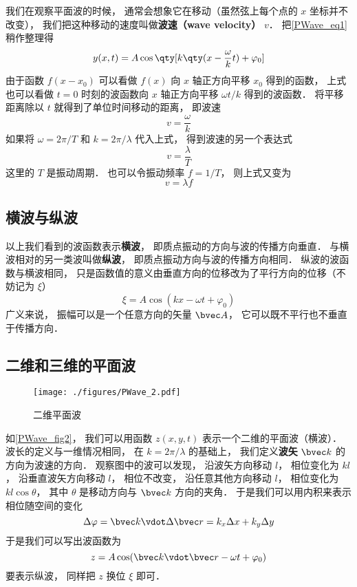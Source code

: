 我们在观察平面波的时候， 通常会想象它在移动（虽然弦上每个点的 $x$ 坐标并不改变）， 我们把这种移动的速度叫做\textbf{波速（wave velocity）} $v$． 把\autoref{PWave_eq1} 稍作整理得
\begin{equation}
y(x, t) = A\cos \qty[k \qty(x - \frac{\omega}{k} t) + \varphi_0]
\end{equation}
由于函数 $f(x - x_0)$ 可以看做 $f(x)$ 向 $x$ 轴正方向平移 $x_0$ 得到的函数， 上式也可以看做 $t = 0$ 时刻的波函数向 $x$ 轴正方向平移 $\omega t/k$ 得到的波函数． 将平移距离除以 $t$ 就得到了单位时间移动的距离， 即波速
\begin{equation}
v = \frac{\omega}{k}
\end{equation}
如果将 $\omega = 2\pi/T$ 和 $k = 2\pi/\lambda$ 代入上式， 得到波速的另一个表达式
\begin{equation}
v = \frac{\lambda}{T}
\end{equation}
这里的 $T$ 是振动周期． 也可以令振动频率 $f = 1/T$， 则上式又变为
\begin{equation}
v = \lambda f
\end{equation}

\subsection{横波与纵波}
以上我们看到的波函数表示\textbf{横波}， 即质点振动的方向与波的传播方向垂直． 与横波相对的另一类波叫做\textbf{纵波}， 即质点振动方向与波的传播方向相同． 纵波的波函数与横波相同， 只是函数值的意义由垂直方向的位移改为了平行方向的位移（不妨记为 $\xi$）
\begin{equation}
\xi = A \cos(k x - \omega t + \varphi_0)
\end{equation}
广义来说， 振幅可以是一个任意方向的矢量 $\bvec A$， 它可以既不平行也不垂直于传播方向．

\subsection{二维和三维的平面波}

\begin{figure}[ht]
\centering
\texttt{[image: ./figures/PWave\_2.pdf]}
\caption{二维平面波} \label{PWave_fig2}
\end{figure}

如\autoref{PWave_fig2}， 我们可以用函数 $z(x,y,t)$ 表示一个二维的平面波（横波）． 波长的定义与一维情况相同， 在 $k = 2\pi/\lambda$ 的基础上， 我们定义\textbf{波矢} $\bvec k$ 的方向为波速的方向．
观察图中的波可以发现， 沿波矢方向移动 $l$， 相位变化为 $kl$， 沿垂直波矢方向移动 $l$， 相位不改变， 沿任意其他方向移动 $l$， 相位变化为 $kl\cos\theta$， 其中 $\theta$ 是移动方向与 $\bvec k$ 方向的夹角． 于是我们可以用内积来表示相位随空间的变化
\begin{equation}
\Delta\varphi = \bvec k \vdot \Delta\bvec r = k_x \Delta x + k_y \Delta y
\end{equation}
于是我们可以写出波函数为
\begin{equation}\label{PWave_eq8}
z = A \cos(\bvec k \vdot \bvec r - \omega t + \varphi_0)
\end{equation}
要表示纵波， 同样把 $z$ 换位 $\xi$ 即可．

